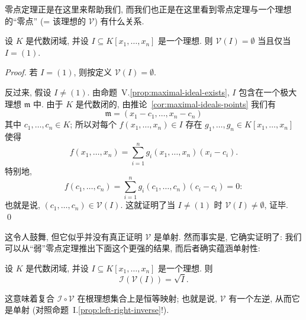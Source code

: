零点定理正是在这里来帮助我们, 而我们也正是在这里看到零点定理与一个理想的``零点'' (= 该理想的 $\mathcal{V}$) 有什么关系.

\begin{proposition}[弱零点定理]\label{prop:weak-nullstellensatz}
设 $K$ 是代数闭域, 并设 $I\subseteq K[x_1,\ldots ,x_n]$ 是一个理想. 则 $\mathcal{V}(I)=\emptyset$ 当且仅当 $I=(1)$.
\end{proposition}

\begin{proof}
若 $I=(1)$, 则按定义 $\mathcal{V}(I)=\emptyset$.

反过来, 假设 $I\neq (1)$. 由命题~V.\ref{prop:maximal-ideal-exists}, $I$ 包含在一个极大理想 $\mathfrak{m}$ 中. 由于 $K$ 是代数闭的, 由推论~\ref{cor:maximal-ideals-points} 我们有
\[
\mathfrak{m}=(x_1-c_1,\ldots ,x_n-c_n)
\]
其中 $c_1,\ldots ,c_n\in K$; 所以对每个 $f(x_1,\ldots ,x_n)\in I$ 存在 $g_1,\ldots ,g_n\in K[x_1,\ldots ,x_n]$ 使得
\[
f(x_1,\ldots ,x_n)=\sum_{i=1}^{n}g_i(x_1,\ldots ,x_n)(x_i-c_i).
\]
特别地,
\[
f(c_1,\ldots ,c_n)=\sum_{i=1}^{n}g_i(c_1,\ldots ,c_n)(c_i-c_i)=0:
\]
也就是说, $(c_1,\ldots ,c_n)\in\mathcal{V}(I)$. 这就证明了当 $I\neq (1)$ 时 $\mathcal{V}(I)\neq\emptyset$, 证毕. \qed
\end{proof}

这令人鼓舞, 但它似乎并没有真正证明 $\mathcal{V}$ 是单射. 然而事实是, 它确实证明了: 我们可以从``弱''零点定理推出下面这个更强的结果, 而后者确实蕴涵单射性:

\begin{proposition}[强零点定理]\label{prop:strong-nullstellensatz}
设 $K$ 是代数闭域, 并设 $I\subseteq K[x_1,\ldots ,x_n]$ 是一个理想. 则
\[
\mathcal{I}(\mathcal{V}(I))=\sqrt{I}.
\]
\end{proposition}

这意味着复合 $\mathcal{I}\circ\mathcal{V}$ 在根理想集合上是恒等映射; 也就是说, $\mathcal{V}$ 有一个左逆, 从而它是单射 (对照命题~I.\ref{prop:left-right-inverse}!).


